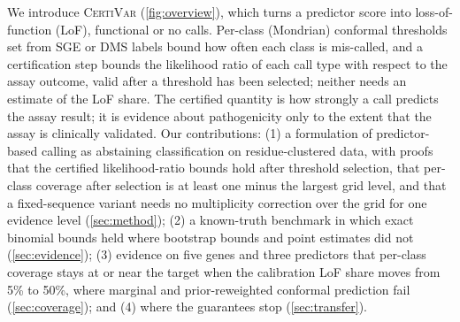 We introduce \textsc{CertiVar} (\cref{fig:overview}), which turns a predictor score into loss-of-function (LoF),
functional or no calls.
Per-class (Mondrian) conformal thresholds set from SGE or DMS labels bound how often each class is mis-called, and a
certification step bounds the likelihood ratio of each call type with respect to the assay outcome, valid after a
threshold has been selected; neither needs an estimate of the LoF share. The certified quantity is how strongly a call
predicts the assay result; it is evidence about pathogenicity only to the extent that the assay is clinically validated.
Our contributions: (1) a formulation of predictor-based calling as abstaining classification on residue-clustered data,
with proofs that the certified likelihood-ratio bounds hold after threshold selection, that per-class coverage after
selection is at least one minus the largest grid level, and that a fixed-sequence variant needs no multiplicity correction over the grid for one evidence level (\cref{sec:method}); (2) a known-truth benchmark in which exact binomial bounds held where
bootstrap bounds and point estimates did not (\cref{sec:evidence}); (3) evidence on five genes and three predictors that
per-class coverage stays at or near the target when the calibration LoF share moves from 5\% to 50\%, where marginal and
prior-reweighted conformal prediction fail (\cref{sec:coverage}); and (4) where the guarantees stop (\cref{sec:transfer}).
